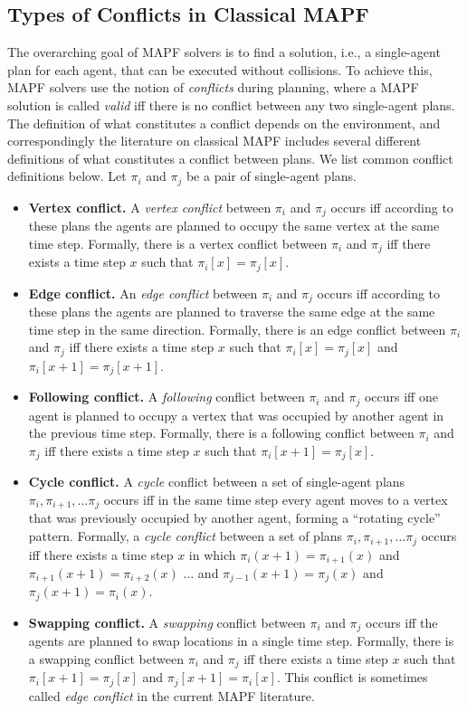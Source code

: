\documentclass[letterpaper]{article} %
\newcommand{\mapf}{\ac{MAPF}\xspace}
\begin{document}
\subsection{Types of Conflicts in Classical MAPF}
The overarching goal of MAPF solvers is to find a solution, i.e., a single-agent plan for each agent, that can be executed without collisions. To achieve this, MAPF solvers use the notion of \emph{conflicts} during planning, where a MAPF solution is called \emph{valid} iff there is no conflict between any two single-agent plans. The definition of what constitutes a conflict depends on the environment, and correspondingly the literature on classical MAPF includes several different definitions of what constitutes a conflict between plans. We list common conflict definitions below. Let $\pi_i$ and $\pi_j$ be a pair of single-agent plans.
\begin{itemize}
\item \textbf{Vertex conflict.} A \emph{vertex conflict} between $\pi_i$ and $\pi_j$ occurs iff  according to these plans the agents are planned to occupy the same vertex at the same time step.
Formally, there is a vertex conflict between $\pi_i$ and $\pi_j$ iff there exists a time step $x$ such that
$\pi_i[x]=\pi_j[x]$.
\item \textbf{Edge conflict.} An \emph{edge conflict} between $\pi_i$ and $\pi_j$ occurs iff
according to these plans the agents are planned to traverse the same edge at the same time step in the same direction.
Formally, there is an edge conflict between $\pi_i$ and $\pi_j$ iff there exists a time step $x$ such that
$\pi_i[x]=\pi_j[x]$ and $\pi_i[x+1]=\pi_j[x+1]$.
\item \textbf{Following conflict.} A \emph{following} conflict between $\pi_i$ and $\pi_j$ occurs iff
one agent is planned to occupy a vertex that was occupied by another agent in the previous time step.
Formally, there is a following conflict between $\pi_i$ and $\pi_j$ iff there exists a time step $x$ such that
$\pi_i[x+1]=\pi_j[x]$.
\item \textbf{Cycle conflict.} A \emph{cycle} conflict  between a set of single-agent plans $\pi_i, \pi_{i+1}, \ldots \pi_j$ occurs iff
in the same time step every agent moves to a vertex that was previously occupied by another agent, forming a ``rotating cycle'' pattern. Formally, a \emph{cycle conflict} between a set of plans $\pi_i, \pi_{i+1}, \ldots \pi_j$
occurs iff there exists a time step $x$ in which
$\pi_i(x+1)=\pi_{i+1}(x)$
and $\pi_{i+1}(x+1)=\pi_{i+2}(x)$
$\ldots$
and $\pi_{j-1}(x+1)=\pi_j(x)$
and $\pi_j(x+1)=\pi_i(x)$.
\item \textbf{Swapping conflict.} A \emph{swapping} conflict between $\pi_i$ and $\pi_j$ occurs iff
the agents are planned to swap locations in a single time step.
Formally, there is a swapping conflict between $\pi_i$ and $\pi_j$ iff there exists a time step $x$ such that
$\pi_i[x+1]=\pi_j[x]$ and $\pi_j[x+1]=\pi_i[x]$. This conflict is sometimes called \emph{edge conflict} in the current \mapf literature.
\end{itemize}
\end{document}
